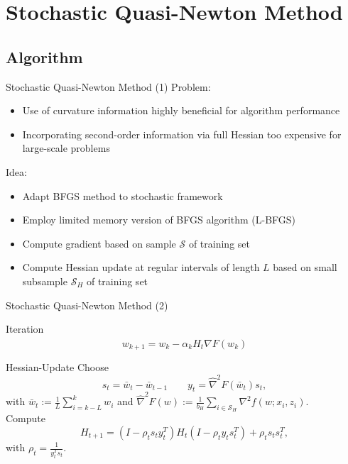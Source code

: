 \documentclass[11pt]{beamer}
\begin{document}
	\section{Stochastic Quasi-Newton Method}
	\subsection{Algorithm}
	
	\begin{frame}{Stochastic Quasi-Newton Method (1)}
		Problem:
		\begin{itemize}
			\item Use of curvature information highly beneficial for algorithm performance
			\item Incorporating second-order information via full Hessian too expensive for
			large-scale problems
		\end{itemize}
		\pause
		Idea:
		\begin{itemize}
			\item Adapt BFGS method to stochastic framework
			\item Employ limited memory version of BFGS algorithm (L-BFGS)
			\item Compute gradient based on sample $\mathcal{S}$ of training set
			\item Compute Hessian update at regular intervals of length $L$ based on small 
			subsample $\mathcal{S}_H$ of training set
		\end{itemize}
	\end{frame}
	
	\begin{frame}{Stochastic Quasi-Newton Method (2)}
		\begin{block}{Iteration}
			\vspace{-0.3 cm}
			\begin{equation*}
				w_{k+1} = w_k - \alpha_k H_t \widehat{\nabla}F(w_k)
			\end{equation*}
		\end{block}
		\begin{block}{Hessian-Update}
			Choose
			\begin{equation*}
				s_t = \bar{w}_t - \bar{w}_{t-1} \qquad y_t = \widehat{\nabla}^2 F(\bar{w}_t) s_t,
			\end{equation*}
			with $\bar{w}_t := \frac{1}{L} \sum^k_{i = k-L} w_i$ and $\widehat{\nabla}^2 F(w)
			:= \frac{1}{b_H} \sum_{i \in \mathcal{S}_H} \nabla^2 f(w; x_i, z_i)$.\\
			\vspace{0.3 cm}
			Compute
			\begin{equation*}
				H_{t+1} = (I - \rho_t s_t y^T_t) H_t (I - \rho_t y_t s^T_t) + \rho_t s_t s^T_t,
			\end{equation*}
			with $\rho_t = \frac{1}{y^T_t s_t}$.
		\end{block}
	\end{frame}
	
\end{document}
